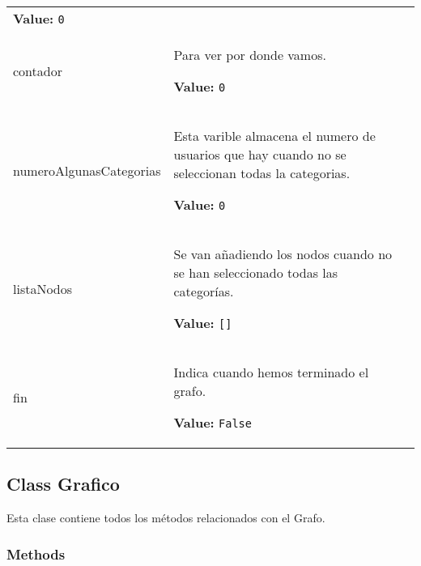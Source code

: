 \begin{longtable}{|p{\varnamewidth}|p{\vardescrwidth}|l}
\textbf{Value:} 
{\tt 0}&\\
\cline{1-2}
\raggedright c\-o\-n\-t\-a\-d\-o\-r\- & \raggedright Para ver por donde vamos.

\textbf{Value:} 
{\tt 0}&\\
\cline{1-2}
\raggedright n\-u\-m\-e\-r\-o\-A\-l\-g\-u\-n\-a\-s\-C\-a\-t\-e\-g\-o\-r\-i\-a\-s\- & \raggedright Esta varible almacena el numero de usuarios que hay cuando no se 
          seleccionan todas la categorias.

\textbf{Value:} 
{\tt 0}&\\
\cline{1-2}
\raggedright l\-i\-s\-t\-a\-N\-o\-d\-o\-s\- & \raggedright Se van añadiendo los nodos cuando no se han seleccionado todas 
          las categorías.

\textbf{Value:} 
{\tt []}&\\
\cline{1-2}
\raggedright f\-i\-n\- & \raggedright Indica cuando hemos terminado el grafo.

\textbf{Value:} 
{\tt False}&\\
\cline{1-2}
\end{longtable}



\subsection{Class Grafico}

    \label{grafico:Grafico}
Esta clase contiene todos los métodos relacionados con el Grafo.



  \subsubsection{Methods}

    \label{grafico:Grafico:setInicio}

    \vspace{0.5ex}

